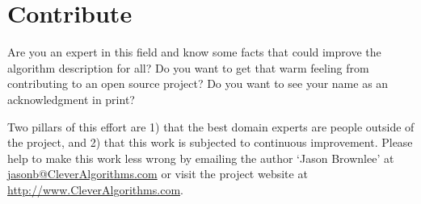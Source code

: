 \documentclass[a4paper, 11pt]{article}
\makeatletter
\newcommand{\myreportauthor}{Jason Brownlee}
\newcommand{\myreportemail}{jasonb@CleverAlgorithms.com}
\newcommand{\myreportwebsite}{http://www.CleverAlgorithms.com}
\makeatother
\begin{document}
% 
% 
\section{Contribute}
\label{sec:contribute}
Are you an expert in this field and know some facts that could improve the algorithm description for all?
Do you want to get that warm feeling from contributing to an open source project? 
Do you want to see your name as an acknowledgment in print?

Two pillars of this effort are 1) that the best domain experts are people outside of the project, and 2) that this work is subjected to continuous improvement. 
Please help to make this work less wrong by emailing the author `\myreportauthor' at \url{\myreportemail} or visit the project website at \url{\myreportwebsite}.



\end{document}
